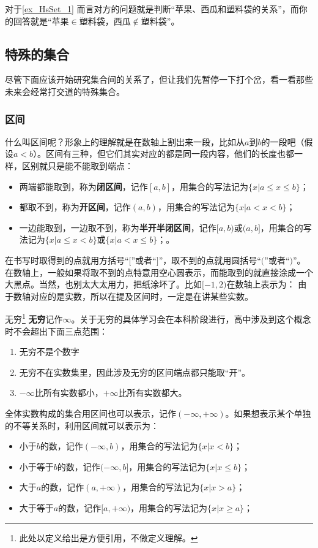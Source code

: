 对于\autoref{ex_HsSet_1} 而言对方的问题就是判断“苹果、西瓜和塑料袋的关系”，而你的回答就是“苹果$\in$塑料袋，西瓜$\notin$塑料袋”。

\subsection{特殊的集合}\label{sub_HsSet_2}

尽管下面应该开始研究集合间的关系了，但让我们先暂停一下打个岔，看一看那些未来会经常打交道的特殊集合。

\subsubsection{区间}

什么叫区间呢？形象上的理解就是在数轴上割出来一段，比如从$a$到$b$的一段吧（假设$a<b$）。区间有三种，但它们其实对应的都是同一段内容，他们的长度也都一样，区别就只是能不能取到端点：
\begin{itemize}
\item 两端都能取到，称为\textbf{闭区间}，记作$[a,b]$，用集合的写法记为$\{x|a\leq x\leq b\}$；
\item 都取不到，称为\textbf{开区间}，记作$(a,b)$，用集合的写法记为$\{x|a< x<b\}$；
\item 一边能取到，一边取不到，称为\textbf{半开半闭区间}，记作$[a,b)$或$(a,b]$，用集合的写法记为$\{x|a\leq x< b\}$或$\{x|a< x\leq b\}$；。
\end{itemize}
在书写时取得到的点就用方括号“$[$”或者“$]$”，取不到的点就用圆括号“$($”或者“$)$”。
在数轴上，一般如果将取不到的点特意用空心圆表示，而能取到的就直接涂成一个大黑点。当然，也别太大太用力，把纸涂坏了。比如$[-1,2)$在数轴上表示为：
\addTODO{画个数轴的图，[-1,2)的区间}
由于数轴对应的是实数，所以在提及区间时，一定是在讲某些实数。

\begin{definition}{无穷\footnote{此处以定义给出是方便引用，不做定义理解。}}
\textbf{无穷}记作$\infty$。关于无穷的具体学习会在本科阶段进行，高中涉及到这个概念时不会超出下面三点范围：
\begin{enumerate}
\item 无穷不是个数字
\item 无穷不在实数集里，因此涉及无穷的区间端点都只能取“开”。
\item $-\infty$比所有实数都小，$+\infty$比所有实数都大。
\end{enumerate}
\end{definition}

全体实数构成的集合用区间也可以表示，记作$(-\infty,+\infty)$。如果想表示某个单独的不等关系时，利用区间就可以表示为：
\begin{itemize}
\item 小于$b$的数，记作$(-\infty,b)$，用集合的写法记为$\{x|x< b\}$；
\item 小于等于$b$的数，记作$(-\infty,b]$，用集合的写法记为$\{x|x\leq b\}$；
\item 大于$a$的数，记作$(a,+\infty)$，用集合的写法记为$\{x|x> a\}$；
\item 大于等于$a$的数，记作$[a,+\infty)$，用集合的写法记为$\{x|x\geq a\}$；
\end{itemize}

